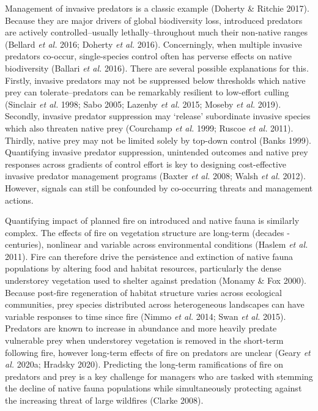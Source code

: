 \documentclass[11pt,a4paper,titlepage,twoside,openright]{style/unimelbthesis}
\begin{document}
\begin{mainmatter}
Management of invasive predators is a classic example (Doherty \& Ritchie 2017). Because they are major drivers of global biodiversity loss, introduced predators are actively controlled--usually lethally--throughout much their non-native ranges (Bellard \emph{et al.} 2016; Doherty \emph{et al.} 2016). Concerningly, when multiple invasive predators co-occur, single-species control often has perverse effects on native biodiversity (Ballari \emph{et al.} 2016). There are several possible explanations for this. Firstly, invasive predators may not be suppressed below thresholds which native prey can tolerate--predators can be remarkably resilient to low-effort culling (Sinclair \emph{et al.} 1998; Sabo 2005; Lazenby \emph{et al.} 2015; Moseby \emph{et al.} 2019). Secondly, invasive predator suppression may `release' subordinate invasive species which also threaten native prey (Courchamp \emph{et al.} 1999; Ruscoe \emph{et al.} 2011). Thirdly, native prey may not be limited solely by top-down control (Banks 1999). Quantifying invasive predator suppression, unintended outcomes and native prey responses across gradients of control effort is key to designing cost-effective invasive predator management programs (Baxter \emph{et al.} 2008; Walsh \emph{et al.} 2012). However, signals can still be confounded by co-occurring threats and management actions.

Quantifying impact of planned fire on introduced and native fauna is similarly complex. The effects of fire on vegetation structure are long-term (decades - centuries), nonlinear and variable across environmental conditions (Haslem \emph{et al.} 2011). Fire can therefore drive the persistence and extinction of native fauna populations by altering food and habitat resources, particularly the dense understorey vegetation used to shelter against predation (Monamy \& Fox 2000). Because post-fire regeneration of habitat structure varies across ecological communities, prey species distributed across heterogeneous landscapes can have variable responses to time since fire (Nimmo \emph{et al.} 2014; Swan \emph{et al.} 2015). Predators are known to increase in abundance and more heavily predate vulnerable prey when understorey vegetation is removed in the short-term following fire, however long-term effects of fire on predators are unclear (Geary \emph{et al.} 2020a; Hradsky 2020). Predicting the long-term ramifications of fire on predators and prey is a key challenge for managers who are tasked with stemming the decline of native fauna populations while simultaneously protecting against the increasing threat of large wildfires (Clarke 2008).


\end{mainmatter}
\end{document}
